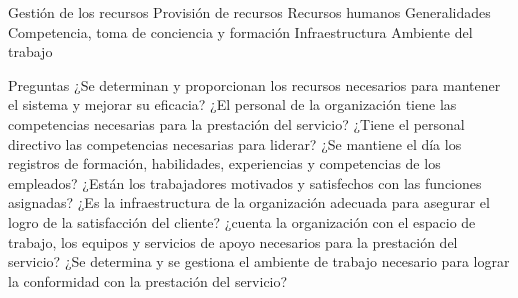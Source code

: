 \documentclass[10pt,a4paper]{article}
\begin{document}
\begin{enumerate}
Gestión de los recursos 
Provisión de recursos
Recursos humanos
Generalidades
Competencia, toma de conciencia y formación
Infraestructura
Ambiente del trabajo

Preguntas
¿Se determinan y proporcionan los recursos necesarios para mantener el sistema y mejorar su eficacia?
¿El personal de la organización tiene las competencias necesarias para la prestación del servicio?
¿Tiene el personal directivo las competencias necesarias para liderar?
¿Se mantiene el día los registros de formación, habilidades, experiencias y competencias de los empleados?
¿Están los trabajadores motivados y satisfechos con las funciones asignadas?
¿Es la infraestructura de la organización adecuada para asegurar el logro de la satisfacción del cliente?
¿cuenta la organización con el espacio de trabajo, los equipos y servicios de apoyo necesarios para la prestación del servicio?
¿Se determina y se gestiona el ambiente de trabajo necesario para lograr la conformidad con la prestación del servicio?


\end{enumerate}
\end{document}

